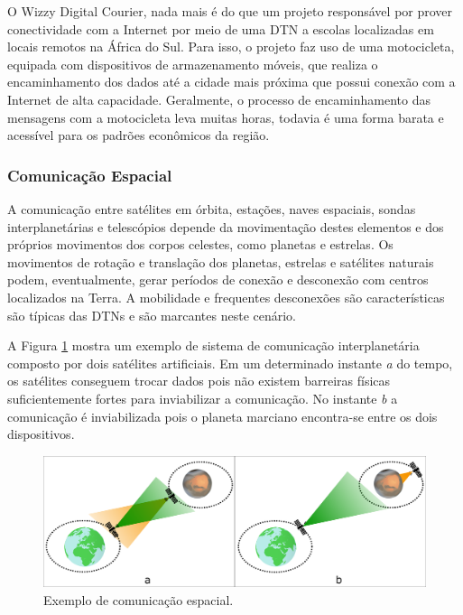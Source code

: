 O Wizzy Digital Courier, nada mais é do que um projeto responsável por prover conectividade com a Internet por meio de uma DTN a escolas localizadas em locais remotos na África do Sul. Para isso, o projeto faz uso de uma motocicleta, equipada com dispositivos de armazenamento móveis, que realiza o encaminhamento dos dados até a cidade mais próxima que possui conexão com a Internet de alta capacidade. Geralmente, o processo de encaminhamento das mensagens com a motocicleta leva muitas horas, todavia é uma forma barata e acessível para os padrões econômicos da região. \cite{jain2004routing}


\subsubsection{Comunicação Espacial}

A comunicação entre satélites em órbita, estações, naves espaciais, sondas interplanetárias e telescópios depende da movimentação destes elementos e dos próprios movimentos dos corpos celestes, como planetas e estrelas. Os movimentos de rotação e translação dos planetas, estrelas e satélites naturais podem, eventualmente, gerar períodos de conexão e desconexão com centros localizados na Terra. A mobilidade e frequentes desconexões são características são típicas das DTNs e são marcantes neste cenário.

A Figura \ref{satelites} mostra um exemplo de sistema de comunicação interplanetária composto por dois satélites artificiais. Em um determinado instante \emph{a} do tempo, os satélites conseguem trocar dados pois não existem barreiras físicas suficientemente fortes para inviabilizar a comunicação. No instante \emph{b} a comunicação é inviabilizada pois o planeta marciano encontra-se entre os dois dispositivos.

\begin{figure}[htp!]
    \centering
    \includegraphics[width=1\textwidth]{figuras/cap_2/secao_1/satelites.png}
    \caption{Exemplo de comunicação espacial.}
    \label{satelites}
\end{figure}

